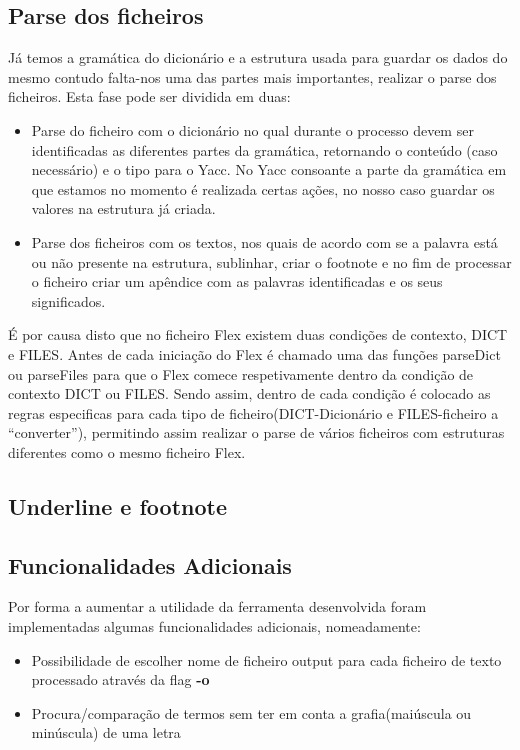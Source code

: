 \documentclass{llncs}
\begin{document}
\subsection{Parse dos ficheiros}
Já temos a gramática do dicionário e a estrutura usada para guardar os dados do mesmo contudo falta-nos uma das partes mais importantes, realizar o parse dos ficheiros. Esta fase pode ser dividida em duas:
\begin{itemize}
\item Parse do ficheiro com o dicionário no qual durante o processo devem ser identificadas as diferentes partes da gramática, retornando o conteúdo (caso necessário) e o tipo para o Yacc. No Yacc consoante a parte da gramática em que estamos no momento é realizada certas ações, no nosso caso guardar os valores na estrutura já criada.
\item Parse dos ficheiros com os textos, nos quais de acordo com se a palavra está ou não presente na estrutura, sublinhar, criar o footnote e no fim de processar o ficheiro criar um apêndice com as palavras identificadas e os seus significados.
\end{itemize}
É por causa disto que no ficheiro Flex existem duas condições de contexto, DICT e FILES. Antes de cada iniciação do Flex é chamado uma das funções parseDict ou parseFiles para que o Flex comece respetivamente dentro da condição de contexto DICT ou FILES. Sendo assim, dentro de cada condição é colocado as regras especificas para cada tipo de ficheiro(DICT-Dicionário e FILES-ficheiro a ``converter''), permitindo assim realizar o parse de vários ficheiros com estruturas diferentes como o mesmo ficheiro Flex.

\subsection{Underline e footnote}

\subsection{Funcionalidades Adicionais}
Por forma a aumentar a utilidade da ferramenta desenvolvida foram implementadas algumas funcionalidades adicionais, nomeadamente:
\begin{itemize}
    \item Possibilidade de escolher nome de ficheiro output para cada ficheiro de texto processado através da flag \textbf{-o}
    \item Procura/comparação de termos sem ter em conta a grafia(maiúscula ou minúscula) de uma letra
\end{itemize}
\end{document}
